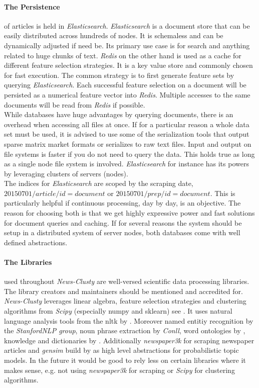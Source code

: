   \paragraph{The Persistence} of articles is held in \emph{Elasticsearch}. \emph{Elasticsearch} is a document store that can be easily distributed across hundreds of nodes. It is schemaless and can be dynamically adjusted if need be. Its primary use case is for search and anything related to huge chunks of text. \emph{Redis} on the other hand is used as a cache for different feature selection strategies. It is a key value store and commonly chosen for fast execution. The common strategy is to first generate feature sets by querying \emph{Elasticsearch}. Each successful feature selection on a document will be persisted as a numerical feature vector into \emph{Redis}. Multiple accesses to the same documents will be read from \emph{Redis} if possible.\\
  While databases have huge advantages by querying documents, there is an overhead when accessing all files at once. If for a particular reason a whole data set must be used, it is advised to use some of the serialization tools that output sparse matrix market formats or serializes to raw text files. Input and output on file systems is faster if you do not need to query the data. This holds true as long as a single node file system is involved. \emph{Elasticsearch} for instance has its powers by leveraging clusters of servers (nodes).\\ 
  The indices for \emph{Elasticsearch} are scoped by the scraping date, $20150701/article/id = document$ or $20150701/prep/id = document$. This is particularly helpful if continuous processing, day by day, is an objective. The reason for choosing both is that we get highly expressive power and fast solutions for document queries and caching. If for several reasons the system should be setup in a distributed system of server nodes, both databases come with well defined abstractions.

  \paragraph{The Libraries} used throughout \emph{News-Clusty} are well-versed scientific data processing libraries. The library creators and maintainers should be mentioned and accredited for. \emph{News-Clusty} leverages linear algebra, feature selection strategies and clustering algorithms from \emph{Scipy} (especially numpy and sklearn) see \cite{ScikitLearn}. It uses natural language analysis tools from the nltk by \cite{NltkPython}. Moreover named entitiy recognition by the \emph{StanfordNLP group}, noun phrase extraction by \emph{Conll}, word ontologies by \wordnet{}, knowledge and dictionaries by \wiki{}. Additionally \emph{newspaper3k} for scraping newspaper articles and \emph{gensim} build by \cite{gensim2010} as high level abstractions for probabilistic topic models. In the future it would be good to rely less on certain libraries where it makes sense, e.g. not using \emph{newspaper3k} for scraping or \emph{Scipy} for clustering algorithms.



